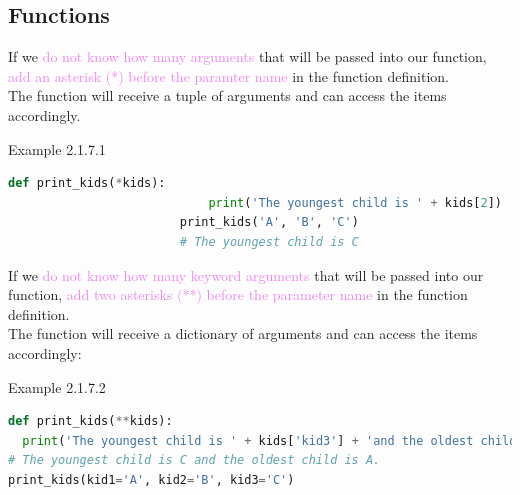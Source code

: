 \documentclass{book}
\begin{document}
    \subsection{Functions}
    If we \textcolor{violet}{do not know how many arguments} that will be passed into our function, \textcolor{violet}{add an asterisk (*) before the paramter name} in the function definition.\\
    The function will receive a tuple of arguments and can access the items accordingly.
    \begin{egBox}[]{Example 2.1.7.1}{}
    \begin{lstlisting}[language=Python, basicstyle=\ttfamily\small, keywordstyle=\color{blue}, commentstyle=\color{forestgreen}, stringstyle=\color{red}, showstringspaces=false]
                        def print_kids(*kids):
                            print('The youngest child is ' + kids[2])
                        print_kids('A', 'B', 'C')
                        # The youngest child is C
    \end{lstlisting}
    \end{egBox}
    If we \textcolor{violet}{do not know how many keyword arguments} that will be passed into our function, \textcolor{violet}{add two asterisks (**) before the parameter name} in the function definition. \\
    The function will receive a dictionary of arguments and can access the items accordingly:
    \begin{egBox}[]{Example 2.1.7.2}{}
    \begin{lstlisting}[language=Python, basicstyle=\ttfamily\small, keywordstyle=\color{blue}, commentstyle=\color{forestgreen}, stringstyle=\color{red}, showstringspaces=false]
def print_kids(**kids):
  print('The youngest child is ' + kids['kid3'] + 'and the oldest child is ' + kids['kid1'])
# The youngest child is C and the oldest child is A.
print_kids(kid1='A', kid2='B', kid3='C')
    \end{lstlisting}
    \end{egBox}
\end{document}

